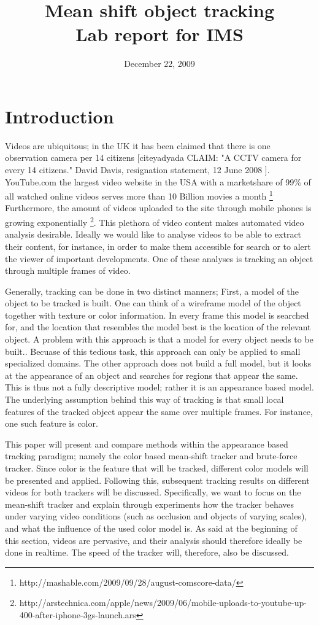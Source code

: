 \documentclass[a4paper,11pt]{article}
\title{Mean shift object tracking\\ Lab report for IMS}
\date{December 22, 2009}
\begin{document}
\maketitle
\section{Introduction}
	Videos are ubiquitous; in the UK it has been claimed that there is one observation camera per 14 citizens [cite{yadyada} CLAIM: "A CCTV camera for every 14 citizens."
	David Davis, resignation statement, 12 June 2008 ]. YouTube.com the largest video website in the USA with a marketshare of 99\% of all watched online videos serves more than 10 Billion movies a month \footnote{http://mashable.com/2009/09/28/august-comscore-data/}
	Furthermore, the amount of videos uploaded to the site through mobile phones is growing exponentially \footnote{http://arstechnica.com/apple/news/2009/06/mobile-uploads-to-youtube-up-400-after-iphone-3gs-launch.ars}. 
	This plethora of video content makes automated video analysis desirable. Ideally we would like to analyse videos to be able to extract their content, for instance, in order to make them accessible for search or to alert the viewer of important developments. One of these analyses is tracking an object through multiple frames of video.

	Generally, tracking can be done in two distinct manners; First, a model of the object to be tracked is built. One can think of a wireframe model of the object together with texture or color information. 
	In every frame this model is searched for, and the location that resembles the model best is the location of the relevant object. A problem with this approach is that a model for every object needs to be built.. Becuase of this tedious task, this approach can only be applied to small specialized domains. 
	The other approach does not build a full model, but it looks at the appearance of an object and searches for regions that appear the same. This is thus not a fully descriptive model; rather it is an appearance based model. 
	The underlying assumption behind this way of tracking is that small local features of the tracked object appear the same over multiple frames. For instance, one such feature is color.

	This paper will present and compare methods within the appearance based tracking paradigm; namely the color based mean-shift tracker and brute-force tracker. 
	Since color is the feature that will be tracked, different color models will be presented and applied. Following this, subsequent tracking results on different videos for both trackers will be discussed.
	Specifically, we want to focus on the mean-shift tracker and explain through experiments how the tracker behaves under varying video conditions (such as occlusion and objects of varying scales), and what the influence of the used color model is.
	As said at the beginning of this section, videos are pervasive, and their analysis should therefore ideally be done in realtime. The speed of the tracker will, therefore, also be discussed.
\end{document}
